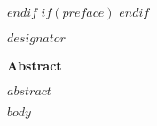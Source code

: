 \documentclass[12pt,letterpaper,toc=flat,oneside]{book}
\begin{document}
 \def\ackhead{\chapter*{Acknowledgements}
  \addcontentsline{toc}{chapter}{Acknowledgements}
  \addtocontents{toc}{\protect\addvspace{10\p@}}
 }
 \def\acktail{\par \null\vspace*{.75in}\hspace*{3in} \@author \newpage} 
$endif$
$if(preface)$
\newenvironment{preface}{
\chapter*{Preface}     
\addcontentsline{toc}{chapter}{Preface}
\addtocontents{toc}{\protect\addvspace{10\p@}}
}{}
$endif$
    \thispagestyle{plain}
    \noindent $designator$
    \begin{center}
	\large\bfseries Abstract
    \end{center}
    \vspace{2em}
    $abstract$
\renewcommand\contentsname{\hfill \bfseries\large Table of Contents\hfill}
\tableofcontents
\newpage
\renewcommand\listtablename{\hfill \bfseries\large List of Tables\hfill}
\listoftables
\newpage
\renewcommand\listfigurename{\hfill \bfseries\large List of Figures\hfill}
\listoffigures
\newpage
$body$
\newpage
\end{document}
